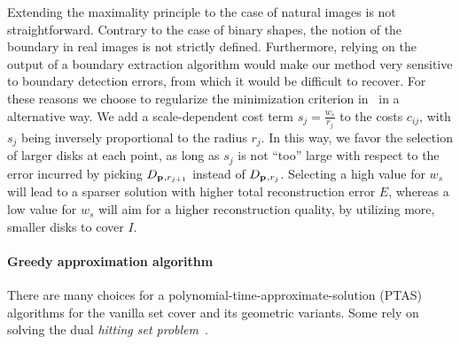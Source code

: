 \documentclass[10pt,twocolumn,letterpaper]{article}
\begin{document}
Extending the maximality principle to the case of natural images is not straightforward.
Contrary to the case of binary shapes, the notion of the boundary in real images is not strictly defined.
Furthermore, relying on the output of a boundary extraction algorithm would make our method very sensitive
to boundary detection errors, from which it would be difficult to recover.
For these reasons we choose to regularize the minimization criterion in~ in a alternative way. 
We add a scale-dependent cost term $s_j = \frac{w_s}{r_j}$ to the costs $c_{ij}$, with $s_j$ 
being inversely proportional to the radius $r_j$.
In this way, we favor the selection of larger disks at each point, as long as $s_j$ is not ``too'' large
with respect to the error incurred by picking $D_{\mathbf{p}_{},r_{j+1}}$ instead of $D_{\mathbf{p}_{},r_j}$.
Selecting a high value for $w_s$ will lead to a sparser solution with higher total reconstruction error $E$,
whereas a low value for $w_s$ will aim for a higher reconstruction quality, by utilizing more, smaller disks
to cover $I$.

\paragraph{Greedy approximation algorithm}
There are many choices for a polynomial-time-approximate-solution (PTAS) algorithms for the vanilla set cover
and its geometric variants.
Some rely on solving the dual \emph{hitting set problem}~\cite{bronnimann1995almost}.
\end{document}
